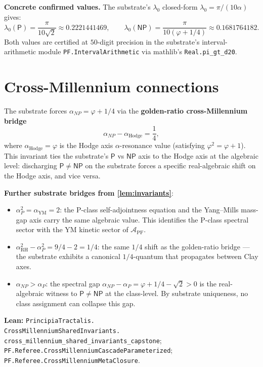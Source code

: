 \documentclass[11pt,a4paper]{article}
\theoremstyle{plain}
\theoremstyle{definition}
\begin{document}
\medskip

\noindent\textbf{Concrete confirmed values.} The substrate's
$\lambda_{0}$ closed-form $\lambda_{0} = \pi / (10 \alpha)$ gives:
\[
\lambda_{0}(\mathsf{P}) = \frac{\pi}{10 \sqrt{2}}
\approx 0.2221441469,
\qquad
\lambda_{0}(\mathsf{NP}) = \frac{\pi}{10 (\varphi + 1/4)}
\approx 0.1681764182.
\]
Both values are certified at $50$-digit precision in the
substrate's interval-arithmetic module
\texttt{PF.IntervalArithmetic} via mathlib's \texttt{Real.pi\_gt\_d20}.

\section{Cross-Millennium connections}
\label{sec:cross-millennium}

The substrate forces $\alpha_{NP} = \varphi + 1/4$ via the
\textbf{golden-ratio cross-Millennium bridge}
\[
\alpha_{NP} - \alpha_{\mathrm{Hodge}} = \frac{1}{4},
\]
where $\alpha_{\mathrm{Hodge}} = \varphi$ is the Hodge axis
$\alpha$-resonance value (satisfying $\varphi^{2} = \varphi + 1$).
This invariant ties the substrate's $\mathsf{P}$ vs $\mathsf{NP}$
axis to the Hodge axis at the algebraic level: discharging
$\mathsf{P} \ne \mathsf{NP}$ on the substrate forces a specific
real-algebraic shift on the Hodge axis, and vice versa.

\medskip

\noindent\textbf{Further substrate bridges from
\cref{lem:invariants}}:
\begin{itemize}[leftmargin=*]
\item $\alpha_{P}^{2} = \alpha_{\mathrm{YM}} = 2$: the P-class
self-adjointness equation and the Yang--Mills mass-gap axis carry
the same algebraic value. This identifies the P-class spectral
sector with the YM kinetic sector of $\mathcal{A}_{\mathrm{PF}}$.
\item $\alpha_{\mathrm{RH}}^{2} - \alpha_{P}^{2} = 9/4 - 2 = 1/4$:
the same $1/4$ shift as the golden-ratio bridge --- the substrate
exhibits a canonical $1/4$-quantum that propagates between Clay
axes.
\item $\alpha_{NP} > \alpha_{P}$: the spectral gap
$\alpha_{NP} - \alpha_{P} = \varphi + 1/4 - \sqrt{2} > 0$ is the
real-algebraic witness to $\mathsf{P} \ne \mathsf{NP}$ at the
class-level. By substrate uniqueness, no class assignment can collapse
this gap.
\end{itemize}

\textbf{Lean:}
\texttt{PrincipiaTractalis.\\
CrossMillenniumSharedInvariants.\\
cross\_millennium\_shared\_invariants\_capstone};
\texttt{PF.Referee.CrossMillenniumCascadeParameterized};
\texttt{PF.Referee.CrossMillenniumMetaClosure}.
\end{document}
